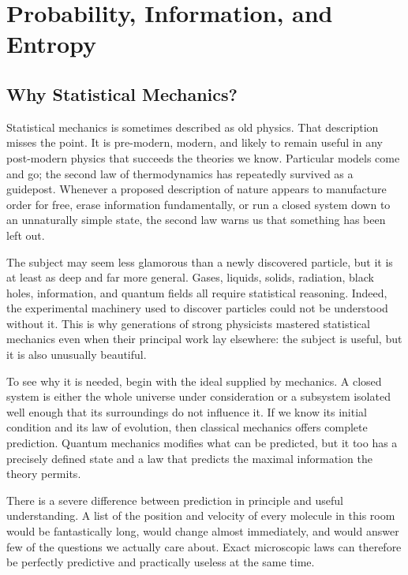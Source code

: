 \chapter{Probability, Information, and Entropy}


\section{Why Statistical Mechanics?}

Statistical mechanics is sometimes described as old physics. That description
misses the point. It is pre-modern, modern, and likely to remain useful in any
post-modern physics that succeeds the theories we know. Particular models
come and go; the second law of thermodynamics has repeatedly survived as a
guidepost. Whenever a proposed description of nature appears to manufacture
order for free, erase information fundamentally, or run a closed system down
to an unnaturally simple state, the second law warns us that something has
been left out.

The subject may seem less glamorous than a newly discovered particle, but it
is at least as deep and far more general. Gases, liquids, solids, radiation,
black holes, information, and quantum fields all require statistical
reasoning. Indeed, the experimental machinery used to discover particles
could not be understood without it. This is why generations of strong
physicists mastered statistical mechanics even when their principal work lay
elsewhere: the subject is useful, but it is also unusually beautiful.

To see why it is needed, begin with the ideal supplied by mechanics. A closed
system is either the whole universe under consideration or a subsystem
isolated well enough that its surroundings do not influence it. If we know
its initial condition and its law of evolution, then classical mechanics
offers complete prediction. Quantum mechanics modifies what can be predicted,
but it too has a precisely defined state and a law that predicts the maximal
information the theory permits.

There is a severe difference between prediction in principle and useful
understanding. A list of the position and velocity of every molecule in this
room would be fantastically long, would change almost immediately, and would
answer few of the questions we actually care about. Exact microscopic laws
can therefore be perfectly predictive and practically useless at the same
time.

